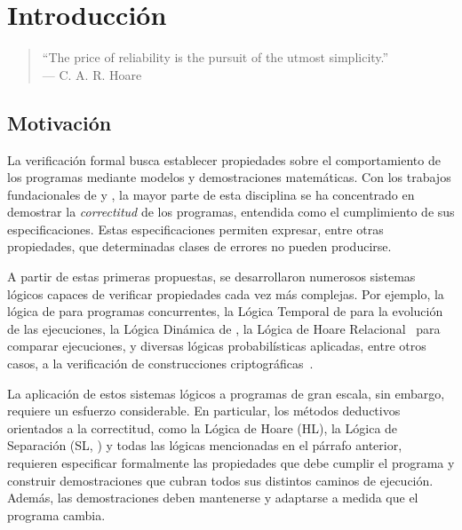 \documentclass[a4paper,	11pt]{report}
\begin{document}

\chapter{Introducción}
\label{cap:introduccion}
\begin{quote}
``The price of reliability is the pursuit of the utmost simplicity.'' \\
\raggedleft --- C. A. R. Hoare
\end{quote}

\section{Motivación}
\label{sec:motivacion}
La verificación formal busca establecer propiedades sobre el comportamiento de los programas mediante modelos y demostraciones matemáticas.
Con los trabajos fundacionales de \citet{floyd67} y \citet{hoare},
la mayor parte de esta disciplina se ha concentrado en demostrar la \emph{correctitud} de los programas,
entendida como el cumplimiento de sus especificaciones.
Estas especificaciones permiten expresar, entre otras propiedades, que determinadas clases de errores no pueden producirse.

A partir de estas primeras propuestas, se desarrollaron numerosos sistemas lógicos capaces de verificar propiedades cada vez más complejas.
Por ejemplo, la lógica de \citet{concurrence} para programas concurrentes,
la Lógica Temporal de \citet{templog} para la evolución de las ejecuciones,
la Lógica Dinámica de \citet{dinlog},
la Lógica de Hoare Relacional~\citep{hlrel} para comparar ejecuciones,
y diversas lógicas probabilísticas aplicadas,
entre otros casos, a la verificación de construcciones criptográficas~\citep{cripto}.

La aplicación de estos sistemas lógicos a programas de gran escala,
sin embargo, requiere un esfuerzo considerable.
En particular, los métodos deductivos orientados a la correctitud, como la
Lógica de Hoare (HL), la Lógica de Separación (SL, \cite{sl}) y
todas las lógicas mencionadas en el párrafo anterior,
requieren especificar formalmente las propiedades que debe cumplir el programa
y construir demostraciones que cubran todos sus distintos caminos de ejecución.
Además, las demostraciones deben mantenerse y adaptarse a medida que el programa cambia.
\end{document}
